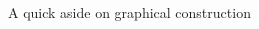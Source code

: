 \documentclass[notes,11pt, aspectratio=169]{beamer}
\newenvironment{wideitemize}{\itemize\addtolength{\itemsep}{10pt}}{\enditemize}
\begin{document}
\begin{frame}{A quick aside on graphical construction}
\begin{columns}[onlytextwidth, T]
\begin{column}{.5\textwidth}
\begin{wideitemize}
      \end{wideitemize}
    \end{column}%
    \hfill%
    \begin{column}{.5\textwidth}
    \end{column}%
  \end{columns}
\end{frame}
\end{document}
